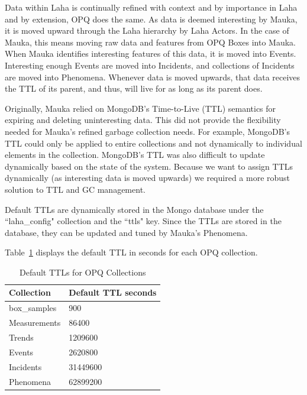 Data within Laha is continually refined with context and by importance in Laha and by extension, OPQ does the same. As data is deemed interesting by Mauka, it is moved upward through the Laha hierarchy by Laha Actors. In the case of Mauka, this means moving raw data and features from OPQ Boxes into Mauka. When Mauka identifies interesting features of this data, it is moved into Events. Interesting enough Events are moved into Incidents, and collections of Incidents are moved into Phenomena. Whenever data is moved upwards, that data receives the TTL of its parent, and thus, will live for as long as its parent does.

Originally, Mauka relied on MongoDB's Time-to-Live (TTL) semantics for expiring and deleting uninteresting data. This did not provide the flexibility needed for Mauka's refined garbage collection needs. For example, MongoDB's TTL could only be applied to entire collections and not dynamically to individual elements in the collection. MongoDB's TTL was also difficult to update dynamically based on the state of the system. Because we want to assign TTLs dynamically (as interesting data is moved upwards) we required a more robust solution to TTL and GC management.

Default TTLs are dynamically stored in the Mongo database under the ``laha\_config" collection and the ``ttls" key. Since the TTLs are stored in the database, they can be updated and tuned by Mauka's Phenomena.

Table~\ref{table:DefaultTtls} displays the default TTL in seconds for each OPQ collection.

\begin{table}[H]
    \centering
    \caption{Default TTLs for OPQ Collections}
    \begin{tabularx}{\textwidth}{XX}
        \toprule
        \textbf{Collection} & \textbf{Default TTL seconds} \\
        \midrule
        box\_samples & 900 \\
        Measurements & 86400 \\
        Trends & 1209600 \\
        Events & 2620800 \\
        Incidents & 31449600 \\
        Phenomena & 62899200 \\
        \bottomrule
    \end{tabularx}
    \label{table:DefaultTtls}
\end{table}

